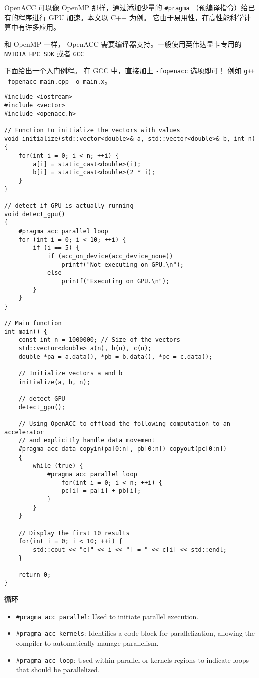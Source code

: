 
\begin{issues}
\issueDraft
\end{issues}


OpenACC 可以像 OpenMP 那样，通过添加少量的 \verb`#pragma` （预编译指令）给已有的程序进行 GPU 加速。本文以 C++ 为例。 它由于易用性，在高性能科学计算中有许多应用。

和 OpenMP 一样， OpenACC 需要编译器支持。一般使用英伟达显卡专用的 \verb`NVIDIA HPC SDK` 或者 \verb`GCC`

下面给出一个入门例程。 在 GCC 中，直接加上 \verb`-fopenacc` 选项即可！ 例如 \verb`g++ -fopenacc main.cpp -o main.x`。

\begin{lstlisting}[language=none,caption=test1.cpp]
#include <iostream>
#include <vector>
#include <openacc.h>

// Function to initialize the vectors with values
void initialize(std::vector<double>& a, std::vector<double>& b, int n) {
	for(int i = 0; i < n; ++i) {
		a[i] = static_cast<double>(i);
		b[i] = static_cast<double>(2 * i);
	}
}

// detect if GPU is actually running
void detect_gpu()
{
	#pragma acc parallel loop
	for (int i = 0; i < 10; ++i) {
		if (i == 5) {
			if (acc_on_device(acc_device_none))
				printf("Not executing on GPU.\n");
			else
				printf("Executing on GPU.\n");
		}
	}
}

// Main function
int main() {
	const int n = 1000000; // Size of the vectors
	std::vector<double> a(n), b(n), c(n);
	double *pa = a.data(), *pb = b.data(), *pc = c.data();

	// Initialize vectors a and b
	initialize(a, b, n);

	// detect GPU
	detect_gpu();

	// Using OpenACC to offload the following computation to an accelerator
	// and explicitly handle data movement
	#pragma acc data copyin(pa[0:n], pb[0:n]) copyout(pc[0:n])
	{
		while (true) {
			#pragma acc parallel loop
				for(int i = 0; i < n; ++i) {
				pc[i] = pa[i] + pb[i];
			}
		}
	}

	// Display the first 10 results
	for(int i = 0; i < 10; ++i) {
		std::cout << "c[" << i << "] = " << c[i] << std::endl;
	}

	return 0;
}
\end{lstlisting}

\textbf{循环}
\begin{itemize}
\item \verb`#pragma acc parallel`: Used to initiate parallel execution.
\item \verb`#pragma acc kernels`: Identifies a code block for parallelization, allowing the compiler to automatically manage parallelism.
\item \verb`#pragma acc loop`: Used within parallel or kernels regions to indicate loops that should be parallelized.
\end{itemize}

